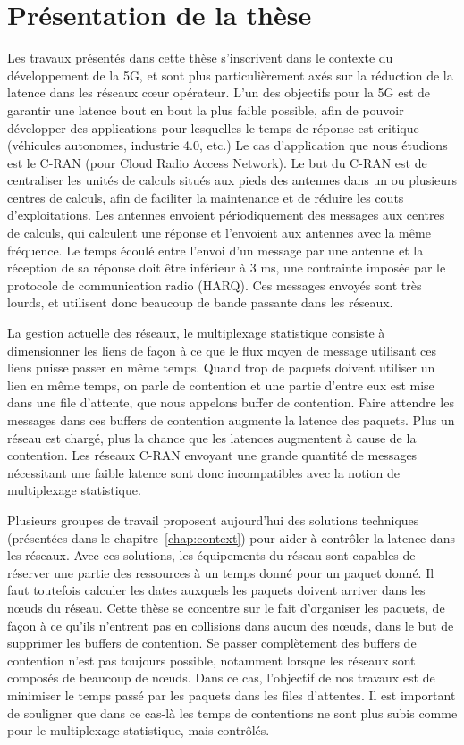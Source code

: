 
\chapter*{Présentation de la thèse}
\label{chap:introfr}


Les travaux présentés dans cette thèse s'inscrivent dans le contexte du développement de la 5G, et sont plus particulièrement axés sur la réduction de la latence dans les réseaux cœur opérateur.
L'un des objectifs pour la 5G est de garantir une latence bout en bout la plus faible possible, afin de pouvoir développer des applications pour lesquelles le temps de réponse est critique (véhicules autonomes, industrie 4.0, etc.)
Le cas d'application que nous étudions est le C-RAN (pour Cloud Radio Access Network). Le but du C-RAN est de centraliser les unités de calculs situés aux pieds des antennes dans un ou plusieurs centres de calculs, afin de faciliter la maintenance et de réduire les couts d'exploitations. Les antennes envoient périodiquement des messages aux centres de calculs, qui calculent une réponse et l'envoient aux antennes avec la même fréquence. Le temps écoulé entre l'envoi d'un message par une antenne et la réception de sa réponse doit être inférieur à $3$ ms, une contrainte imposée par le protocole de communication radio (HARQ). Ces messages envoyés sont très lourds, et utilisent donc beaucoup de bande passante dans les réseaux.

La gestion actuelle des réseaux, le multiplexage statistique consiste à dimensionner les liens de façon à ce que le flux moyen de message utilisant ces liens puisse passer en même temps. Quand trop de paquets doivent utiliser un lien en même temps, on parle de contention et une partie d'entre eux est mise dans une file d'attente, que nous appelons buffer de contention. Faire attendre les messages dans ces buffers de contention augmente la latence des paquets. Plus un réseau est chargé, plus la chance que les latences augmentent à cause de la contention. Les réseaux C-RAN envoyant une grande quantité de messages nécessitant une faible latence sont donc incompatibles avec la notion de multiplexage statistique.

Plusieurs groupes de travail proposent aujourd'hui des solutions techniques (présentées dans le chapitre~\ref{chap:context}) pour aider à contrôler la latence dans les réseaux. Avec ces solutions, les équipements du réseau sont capables de réserver une partie des ressources à un temps donné pour un paquet donné. Il faut toutefois calculer les dates auxquels les paquets doivent arriver dans les nœuds du réseau. Cette thèse se concentre sur le fait d'organiser les paquets, de façon à ce qu'ils n'entrent pas en collisions dans aucun des nœuds, dans le but de supprimer les buffers de contention. Se passer complètement des buffers de contention n'est pas toujours possible, notamment lorsque les réseaux sont composés de beaucoup de nœuds. Dans ce cas, l'objectif de nos travaux est de minimiser le temps passé par les paquets dans les files d'attentes. Il est important de souligner que dans ce cas-là les temps de contentions ne sont plus subis comme pour le multiplexage statistique, mais contrôlés.

